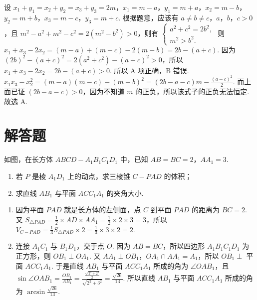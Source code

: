 \begin{solution}
设 \(x_1+y_1=x_2+y_2=x_3+y_3=2m\)，\(x_1=m-a\)，\(y_1=m+a\)，\(x_2=m-b\)，\(y_2=m+b\)，\(x_3=m-c\)，\(y_3=m+c\). 根据题意，应该有 \(a\ne b\ne c\)，\(a\)，\(b\)，\(c>0\)，且 \(m^2-a^2+m^2-c^2=2\left( m^2-b^2 \right)>0\)，则有 \(\begin{cases}
a^2+c^2=2b^2,\\
m^2>b^2.
\end{cases}\) 则 \(x_1+x_3-2x_2=\left( m-a \right)+\left( m-c \right)-2\left( m-b \right)=2b-\left( a+c \right)\). 因为 \(\left( 2b \right)^2-\left( a+c \right)^2=2\left( a^2+c^2 \right)-\left( a+c \right)^2>0\)，所以 \(x_1+x_3-2x_2=2b-\left( a+c \right)>0\). 所以 A 项正确，B 错误. \(x_1x_3-x_2^2=\left( m-a \right)\left( m-c \right)-\left( m-b \right)^2=\left( 2b-a-c \right)m-\frac{\left( a-c \right)^2}{2}\). 而上面已证 \(\left( 2b-a-c \right)>0\)，因为不知道 \(m\) 的正负，所以该式子的正负无法恒定. 故选 A.
\end{solution}
\section{解答题}

\begin{problem}
如图，在长方体 \(ABCD-A_1B_1C_1D_1\) 中，已知 \(AB=BC=2\)，\(AA_1=3\).

\begin{enumerate}
\item 若 \(P\) 是棱 \(A_1D_1\) 上的动点，求三棱锥 \(C-PAD\) 的体积；
\item 求直线 \(AB_1\) 与平面 \(ACC_1A_1\) 的夹角大小.
\end{enumerate}

\end{problem}

\begin{solution}
\begin{enumerate}
\item 因为平面 \(PAD\) 就是长方体的左侧面，点 \(C\) 到平面 \(PAD\) 的距离为 \(BC=2\). 又 \(S_{\triangle PAD}=\frac12\times AD\times AA_1=\frac12\times 2\times 3=3\)，所以 \(V_{C-PAD}=\frac13 S_{\triangle PAD}\times 2=\frac13\times 3\times 2=2\).

\item

连接 \(A_1C_1\) 与 \(B_1D_1\)，交于点 \(O\). 因为 \(AB=BC\)，所以四边形 \(A_1B_1C_1D_1\) 为正方形，则 \(OB_1\perp OA_1\). 又 \(AA_1\perp OB_1\)，\(OA_1\cap AA_1=A_1\)，所以 \(OB_1\perp\) 平面 \(ACC_1A_1\). 于是直线 \(AB_1\) 与平面 \(ACC_1A_1\) 所成的角为 \(\angle OAB_1\)，且 \(\sin \angle OAB_1=\frac{OB_1}{AB_1}=\frac{\frac{\sqrt{2^2+2^2}}{2}}{\sqrt{2^2+3^2}}=\frac{\sqrt{26}}{13}\). 所以直线 \(AB_1\) 与平面 \(ACC_1A_1\) 所成的角为 \(\arcsin \frac{\sqrt{26}}{13}\).
\end{enumerate}
\end{solution}

